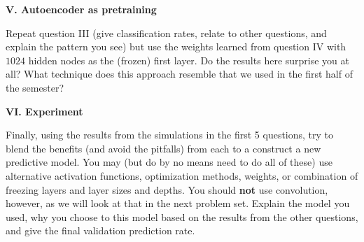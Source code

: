 \documentclass[12pt]{article}
\begin{document}
\newpage

\textbf{V. Autoencoder as pretraining}

Repeat question III (give classification rates, relate to other questions,
and explain the pattern you see) but use the weights learned from question IV with
$1024$ hidden nodes as the (frozen) first layer. Do the results here surprise you
at all? What technique does this approach resemble that we used in the first
half of the semester?

\textbf{VI. Experiment}

Finally, using the results from the simulations in the first 5 questions,
try to blend the benefits (and avoid the pitfalls) from each to a construct
a new predictive model. You may (but do by no means need to do all of these)
use alternative activation functions, optimization methods, weights,
or combination of freezing layers and layer sizes and depths.
You should \textbf{not} use convolution, however, as we will look at that
in the next problem set. Explain the model you used, why you choose to
this model based on the results from the other questions, and give the
final validation prediction rate.
\end{document}
